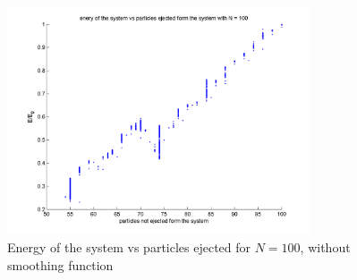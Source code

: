 \documentclass[10pt,a4paper]{article}
\begin{document}
\begin{figure}[h]
	\caption{Energy of the system vs particles ejected for $N=100$, without smoothing function\label{d3}}
	\includegraphics[width=0.8\textwidth]{d3.png}
\end{figure}
\end{document}
